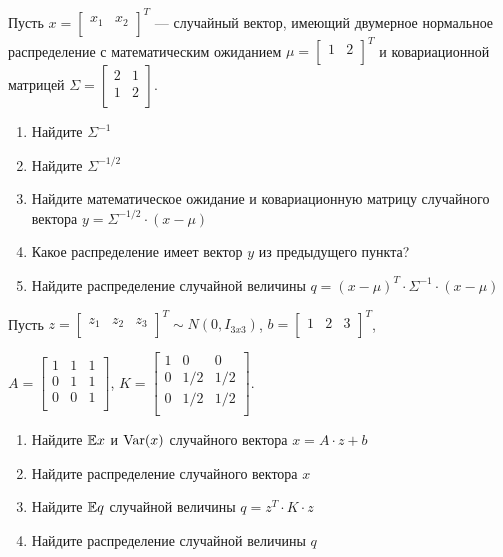 \documentclass[pdftex,11pt,openany]{book}\usepackage[]{graphicx}\usepackage[]{color}
\begin{document}
\begin{problem}
Пусть $x =  \begin{bmatrix}
x_1 & x_2\\
\end{bmatrix} ^T$ --- случайный вектор, имеющий двумерное нормальное распределение с математическим ожиданием $\mu =  \begin{bmatrix}
1 & 2\\
\end{bmatrix} ^T$ и ковариационной матрицей $\Sigma = 
\begin{bmatrix}
2 & 1 \\
1 & 2 \\
\end{bmatrix} $. 

\begin{enumerate}
\item Найдите $\Sigma^{-1}$
\item Найдите $\Sigma^{-1/2}$
\item Найдите математическое ожидание и ковариационную матрицу случайного вектора $y = \Sigma^{-1/2} \cdot (x - \mu)$
\item Какое распределение имеет вектор $y$ из предыдущего пункта?
\item Найдите распределение случайной величины $q = (x- \mu)^T \cdot \Sigma^{-1} \cdot (x - \mu)$
\end{enumerate}
\end{problem}

\begin{solution}
\end{solution}


\begin{problem}
Пусть $z =  \begin{bmatrix}
z_1 & z_2 & z_3\\
\end{bmatrix} ^T \sim N(0, I_{3x3})$, $b =  \begin{bmatrix}
1 & 2 & 3\\
\end{bmatrix} ^T$,

$A =  \begin{bmatrix}
1 & 1 & 1 \\
0 & 1 & 1 \\
0 & 0 & 1 \\
\end{bmatrix} $, $K =  \begin{bmatrix}
1 & 0 & 0 \\
0 & 1/2 & 1/2 \\
0 & 1/2 & 1/2 \\
\end{bmatrix} $.

\begin{enumerate}
\item Найдите $\mathbb{E} x$ и $\operatorname{Var} (x)$ случайного вектора $x = A \cdot z + b$
\item Найдите распределение случайного вектора $x$
\item Найдите $\mathbb{E} q$ случайной величины $q = z^T \cdot K \cdot z$
\item Найдите распределение случайной величины $q$
\end{enumerate}
\end{problem}
\end{document}
